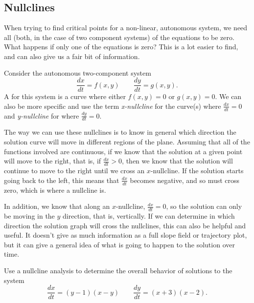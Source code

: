 \documentclass{ximera}
\begin{document}
\subsection{Nullclines}

When trying to find critical points for a non-linear, autonomous system, we need all (both, in the case of two component systems) of the equations to be zero. What happens if only one of the equations is zero? This is a lot easier to find, and can also give us a fair bit of information. 

\begin{definition}[Nullcline] 
    Consider the autonomous two-component system
    \begin{equation*}
        \frac{dx}{dt} = f(x,y) \qquad \frac{dy}{dt} = g(x,y).
    \end{equation*}
    A \emph{} for this system is a curve where either $f(x,y) = 0$ or $g(x,y) = 0$. We can also be more specific and use the term \emph{x-nullcline} for the curve(s) where $\frac{dx}{dt} = 0$ and \emph{y-nullcline} for where $\frac{dy}{dt} = 0$.
\end{definition}

The way we can use these nullclines is to know in general which direction the solution curve will move in different regions of the plane. Assuming that all of the functions involved are continuous, if we know that the solution at a given point will move to the right, that is, if $\frac{dx}{dt} > 0$, then we know that the solution will continue to move to the right until we cross an $x$-nullcline. If the solution starts going back to the left, this means that $\frac{dx}{dt}$ becomes negative, and so must cross zero, which is where a nullcline is.

In addition, we know that along an $x$-nullcline, $\frac{dx}{dt} = 0$, so the solution can only be moving in the $y$ direction, that is, vertically. If we can determine in which direction the solution graph will cross the nullclines, this can also be helpful and useful. It doesn't give as much information as a full slope field or trajectory plot, but it can give a general idea of what is going to happen to the solution over time. 

\begin{example} \label{ex:Nullcline1}
    Use a nullcline analysis to determine the overall behavior of solutions to the system
    \begin{equation*}
        \frac{dx}{dt} = (y-1)(x-y) \qquad \frac{dy}{dt} = (x+3)(x-2).
    \end{equation*}
\end{example}
\end{document}
